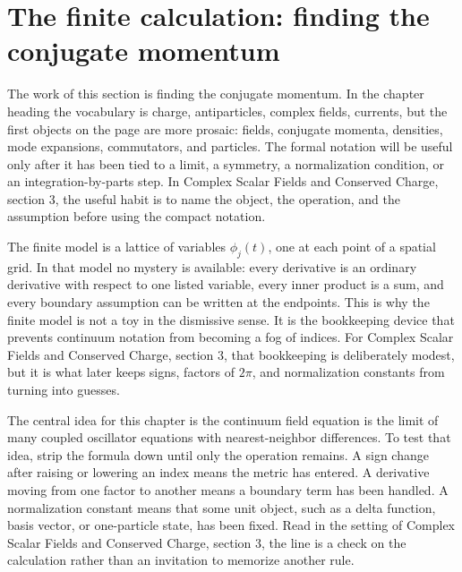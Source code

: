 \section{The finite calculation: finding the conjugate momentum}













The work of this section is finding the conjugate momentum.  In the chapter heading the vocabulary is charge, antiparticles, complex fields, currents, but the first objects on the page are more prosaic: fields, conjugate momenta, densities, mode expansions, commutators, and particles.  The formal notation will be useful only after it has been tied to a limit, a symmetry, a normalization condition, or an integration-by-parts step.  In Complex Scalar Fields and Conserved Charge, section 3, the useful habit is to name the object, the operation, and the assumption before using the compact notation.

The finite model is a lattice of variables \(\phi_j(t)\), one at each point of a spatial grid.  In that model no mystery is available: every derivative is an ordinary derivative with respect to one listed variable, every inner product is a sum, and every boundary assumption can be written at the endpoints.  This is why the finite model is not a toy in the dismissive sense.  It is the bookkeeping device that prevents continuum notation from becoming a fog of indices.  For Complex Scalar Fields and Conserved Charge, section 3, that bookkeeping is deliberately modest, but it is what later keeps signs, factors of \(2\pi\), and normalization constants from turning into guesses.

The central idea for this chapter is the continuum field equation is the limit of many coupled oscillator equations with nearest-neighbor differences.  To test that idea, strip the formula down until only the operation remains.  A sign change after raising or lowering an index means the metric has entered.  A derivative moving from one factor to another means a boundary term has been handled.  A normalization constant means that some unit object, such as a delta function, basis vector, or one-particle state, has been fixed.  Read in the setting of Complex Scalar Fields and Conserved Charge, section 3, the line is a check on the calculation rather than an invitation to memorize another rule.

